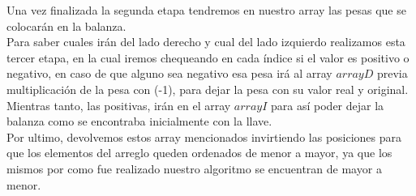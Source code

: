 Una vez finalizada la segunda etapa tendremos en nuestro array las pesas que se colocar\'an en la balanza.\\
Para saber cuales ir\'an del lado derecho y cual del lado izquierdo realizamos esta tercer etapa, en la cual iremos chequeando en cada \'indice si el valor es positivo o negativo, en caso de que alguno sea negativo esa pesa ir\'a al array $arrayD$ previa multiplicaci\'on de la pesa con (-1), para dejar la pesa con su valor real y original. Mientras tanto, las positivas, ir\'an en el array $arrayI$ para as\'i poder dejar la balanza como se encontraba inicialmente con la llave.\\

Por ultimo, devolvemos estos array mencionados invirtiendo las posiciones para que los elementos del arreglo queden ordenados de menor a mayor, ya que los mismos por como fue realizado nuestro algoritmo se encuentran de mayor a menor.\\